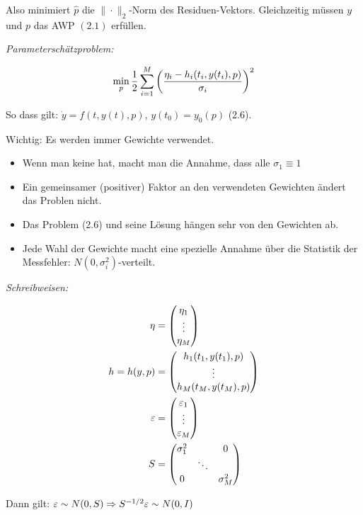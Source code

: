 Also minimiert $\hat p$ die $\|\cdot\|_2$-Norm des Residuen-Vektors. Gleichzeitig müssen $y$ und $p$ das AWP $(2.1)$ erfüllen.

\emph{Parameterschätzproblem:}

\[\min_p \frac 12 \sum_{i=1}^M \left(\frac{\eta_i - h_i(t_i,y(t_i),p)}{\sigma_i}\right)^2\]

So dass gilt: $\dot y = f(t,y(t),p)$, $y(t_0) = y_0(p)$ (2.6).

Wichtig: Es werden immer Gewichte verwendet.

\begin{itemize}
\item Wenn man keine hat, macht man die Annahme, dass alle $\sigma_1 \equiv 1$
\item Ein gemeinsamer (positiver) Faktor an den verwendeten Gewichten ändert das Problen nicht.
\item Das Problem (2.6) und seine Lösung hängen sehr von den Gewichten ab.
\item Jede Wahl der Gewichte macht eine spezielle Annahme über die Statistik der Messfehler: $N(0,\sigma_i^2)$-verteilt.
\end{itemize}

\emph{Schreibweisen:}

\begin{align*}
\eta &= \begin{pmatrix} \eta_1 \\ \vdots \\ \eta_M \end{pmatrix} \\
h = h(y,p) &= \begin{pmatrix} h_1(t_1,y(t_1), p) \\ \vdots \\ h_M(t_M, y(t_M),p) \end{pmatrix} \\
\varepsilon &= \begin{pmatrix} \varepsilon_1 \\ \vdots \\ \varepsilon_M \end{pmatrix}\\
S &= \begin{pmatrix} \sigma_1^2 & & 0 \\ & \ddots & \\ 0 & & \sigma_M^2 \end{pmatrix}
\end{align*}

Dann gilt: $\varepsilon \sim N(0,S) \Rightarrow S^{-1/2} \varepsilon \sim N(0,I)$

